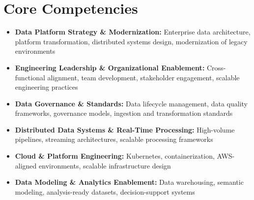 \section{Core Competencies}

\begin{itemize}
    \item \textbf{Data Platform Strategy \& Modernization:} Enterprise data architecture, platform transformation, distributed systems design, modernization of legacy environments
    \item \textbf{Engineering Leadership \& Organizational Enablement:} Cross-functional alignment, team development, stakeholder engagement, scalable engineering practices
    \item \textbf{Data Governance \& Standards:} Data lifecycle management, data quality frameworks, governance models, ingestion and transformation standards
    \item \textbf{Distributed Data Systems \& Real-Time Processing:} High-volume pipelines, streaming architectures, scalable processing frameworks
    \item \textbf{Cloud \& Platform Engineering:} Kubernetes, containerization, AWS-aligned environments, scalable infrastructure design
    \item \textbf{Data Modeling \& Analytics Enablement:} Data warehousing, semantic modeling, analysis-ready datasets, decision-support systems
\end{itemize}